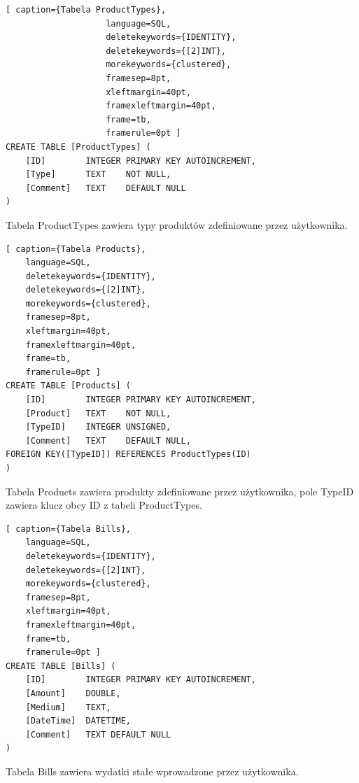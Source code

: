 \documentclass[a4paper,10pt]{report}
\begin{document}

\begin{minipage}{\textwidth}
\begin{lstlisting}[ caption={Tabela ProductTypes},
                    language=SQL,
                    deletekeywords={IDENTITY},
                    deletekeywords={[2]INT},
                    morekeywords={clustered},
                    framesep=8pt,
                    xleftmargin=40pt,
                    framexleftmargin=40pt,
                    frame=tb,
                    framerule=0pt ]
CREATE TABLE [ProductTypes] (
    [ID] 		INTEGER PRIMARY KEY AUTOINCREMENT,
    [Type] 		TEXT 	NOT NULL,
    [Comment] 	TEXT 	DEFAULT NULL
)
\end{lstlisting}
{Tabela ProductTypes zawiera typy produktów zdefiniowane przez użytkownika.}
\end{minipage}



\begin{minipage}{\textwidth}
\begin{lstlisting}[ caption={Tabela Products},
    language=SQL,
    deletekeywords={IDENTITY},
    deletekeywords={[2]INT},
    morekeywords={clustered},
    framesep=8pt,
    xleftmargin=40pt,
    framexleftmargin=40pt,
    frame=tb,
    framerule=0pt ]
CREATE TABLE [Products] (
    [ID]        INTEGER PRIMARY KEY AUTOINCREMENT,
    [Product]   TEXT    NOT NULL,
    [TypeID]	INTEGER UNSIGNED, 
    [Comment] 	TEXT    DEFAULT NULL,
FOREIGN KEY([TypeID]) REFERENCES ProductTypes(ID)
)
\end{lstlisting}
{Tabela Products zawiera produkty zdefiniowane przez użytkownika, pole TypeID 
zawiera klucz obcy ID z tabeli ProductTypes.}
\end{minipage}

\begin{minipage}{\textwidth}
\begin{lstlisting}[ caption={Tabela Bills},
    language=SQL,
    deletekeywords={IDENTITY},
    deletekeywords={[2]INT},
    morekeywords={clustered},
    framesep=8pt,
    xleftmargin=40pt,
    framexleftmargin=40pt,
    frame=tb,
    framerule=0pt ]
CREATE TABLE [Bills] (
    [ID]        INTEGER PRIMARY KEY AUTOINCREMENT,
    [Amount]    DOUBLE,
    [Medium]    TEXT,
    [DateTime]  DATETIME,
    [Comment]   TEXT DEFAULT NULL
)
\end{lstlisting}
{Tabela Bills zawiera wydatki stałe wprowadzone przez użytkownika.}
\end{minipage}
\end{document}
